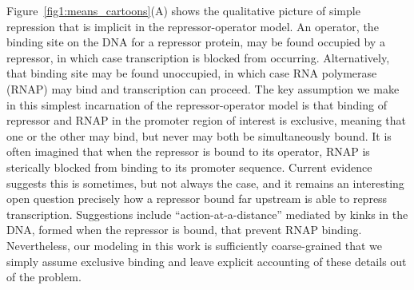 Figure~\ref{fig1:means_cartoons}(A) shows the qualitative picture of simple
repression that is implicit in the repressor-operator model. An operator, the
binding site on the DNA for a repressor protein, may be found occupied by a
repressor, in which case transcription is blocked from occurring. Alternatively,
that binding site may be found unoccupied, in which case RNA polymerase (RNAP)
may bind and transcription can proceed. The key assumption we make in this
simplest incarnation of the repressor-operator model is that binding of
repressor and RNAP in the promoter region of interest is exclusive, meaning that
one or the other may bind, but never may both be simultaneously bound. It is
often imagined that when the repressor is bound to its operator, RNAP is
sterically blocked from binding to its promoter sequence. Current evidence
suggests this is sometimes, but not always the case, and it remains an
interesting open question precisely how a repressor bound far upstream is able
to repress transcription. 
Suggestions include ``action-at-a-distance'' mediated by kinks in the DNA,
formed when the repressor is bound, that prevent RNAP binding. Nevertheless, our
modeling in this work is sufficiently coarse-grained that we simply assume
exclusive binding and leave explicit accounting of these details out of the
problem.

